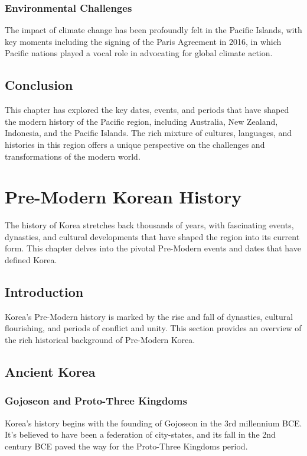 \documentclass[a4paper,12pt]{book}
\begin{document}
\subsection{Environmental Challenges}
\label{subsec:environmental-challenges}
The impact of climate change has been profoundly felt in the Pacific Islands, with key moments including the signing of the Paris Agreement in 2016, in which Pacific nations played a vocal role in advocating for global climate action.

\section{Conclusion}
\label{sec:conclusion-modern-pacific}
This chapter has explored the key dates, events, and periods that have shaped the modern history of the Pacific region, including Australia, New Zealand, Indonesia, and the Pacific Islands. The rich mixture of cultures, languages, and histories in this region offers a unique perspective on the challenges and transformations of the modern world.

\chapter{Pre-Modern Korean History}
\label{ch:pre-modern-korean-history}

The history of Korea stretches back thousands of years, with fascinating events, dynasties, and cultural developments that have shaped the region into its current form. This chapter delves into the pivotal Pre-Modern events and dates that have defined Korea.

\section{Introduction}
\label{sec:introduction-pre-modern-korea}
Korea’s Pre-Modern history is marked by the rise and fall of dynasties, cultural flourishing, and periods of conflict and unity. This section provides an overview of the rich historical background of Pre-Modern Korea.

\section{Ancient Korea}
\label{sec:ancient-korea}

\subsection{Gojoseon and Proto-Three Kingdoms}
\label{subsec:gojoseon-proto-three-kingdoms}
Korea’s history begins with the founding of Gojoseon in the 3rd millennium BCE. It’s believed to have been a federation of city-states, and its fall in the 2nd century BCE paved the way for the Proto-Three Kingdoms period.
\end{document}
